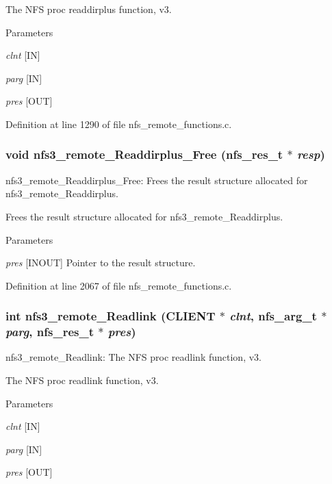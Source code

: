 The NFS proc readdirplus function, v3.


\begin{DoxyParams}{Parameters}
\item[{\em clnt}][IN] \item[{\em parg}][IN] \item[{\em pres}][OUT] \end{DoxyParams}


Definition at line 1290 of file nfs\_\-remote\_\-functions.c.
\subsubsection[{nfs3\_\-remote\_\-Readdirplus\_\-Free}]{\setlength{\rightskip}{0pt plus 5cm}void nfs3\_\-remote\_\-Readdirplus\_\-Free (nfs\_\-res\_\-t $\ast$ {\em resp})}\label{group__NFSprocs_ga92f65acab38933aa9ee83e340f9ba3fe}
nfs3\_\-remote\_\-Readdirplus\_\-Free: Frees the result structure allocated for nfs3\_\-remote\_\-Readdirplus.

Frees the result structure allocated for nfs3\_\-remote\_\-Readdirplus.


\begin{DoxyParams}{Parameters}
\item[{\em pres}][INOUT] Pointer to the result structure. \end{DoxyParams}


Definition at line 2067 of file nfs\_\-remote\_\-functions.c.
\subsubsection[{nfs3\_\-remote\_\-Readlink}]{\setlength{\rightskip}{0pt plus 5cm}int nfs3\_\-remote\_\-Readlink (CLIENT $\ast$ {\em clnt}, \/  nfs\_\-arg\_\-t $\ast$ {\em parg}, \/  nfs\_\-res\_\-t $\ast$ {\em pres})}\label{group__NFSprocs_gae4a1980500759e95ffcf102bfb340b09}
nfs3\_\-remote\_\-Readlink: The NFS proc readlink function, v3.

The NFS proc readlink function, v3.


\begin{DoxyParams}{Parameters}
\item[{\em clnt}][IN] \item[{\em parg}][IN] \item[{\em pres}][OUT] \end{DoxyParams}


